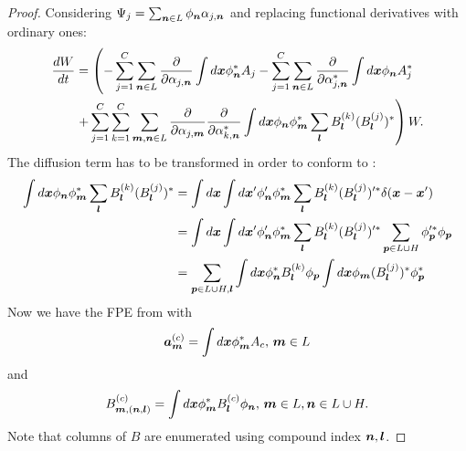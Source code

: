 \begin{proof}
Considering $\Psi_j = \sum_{\boldsymbol{n} \in L} \phi_{\boldsymbol{n}} \alpha_{j,\boldsymbol{n}}$ and replacing functional derivatives with ordinary ones:
\begin{equation*}
\begin{split}
	\frac{dW}{dt}
	& = \left(
		- \sum_{j=1}^C \sum_{\boldsymbol{n} \in L}
			\frac{\partial}{\partial \alpha_{j,\boldsymbol{n}}}
			\int d\boldsymbol{x} \phi_{\boldsymbol{n}}^* A_j
		- \sum_{j=1}^C \sum_{\boldsymbol{n} \in L}
			\frac{\partial}{\partial \alpha_{j,\boldsymbol{n}}^*}
			\int d\boldsymbol{x} \phi_{\boldsymbol{n}} A_j^*
		\right. \\
	&	\left. + \sum_{j=1}^C \sum_{k=1}^C
			\sum_{\boldsymbol{m},\boldsymbol{n} \in L}
			\frac{\partial}{\partial \alpha_{j,\boldsymbol{m}}}
			\frac{\partial}{\partial \alpha_{k,\boldsymbol{n}}^*}
			\int d\boldsymbol{x}
			\phi_{\boldsymbol{n}} \phi_{\boldsymbol{m}}^*
			\sum_{\boldsymbol{l}} B_{\boldsymbol{l}}^{(k)} (B_{\boldsymbol{l}}^{(j)})^*
	\right) W.
\end{split}
\end{equation*}
The diffusion term has to be transformed in order to conform to :
\begin{equation*}
\begin{split}
	\int d\boldsymbol{x} \phi_{\boldsymbol{n}} \phi_{\boldsymbol{m}}^* \sum_{\boldsymbol{l}} B_{\boldsymbol{l}}^{(k)} (B_{\boldsymbol{l}}^{(j)})^*
	& = \int d\boldsymbol{x} \int d\boldsymbol{x}^\prime
			\phi_{\boldsymbol{n}}^\prime \phi_{\boldsymbol{m}}^*
			\sum_{\boldsymbol{l}} B_{\boldsymbol{l}}^{(k)} (B_{\boldsymbol{l}}^{(j)})^{\prime*}
			\delta(\boldsymbol{x} - \boldsymbol{x}^\prime) \\
	& = \int d\boldsymbol{x} \int d\boldsymbol{x}^\prime
			\phi_{\boldsymbol{n}}^\prime \phi_{\boldsymbol{m}}^*
			\sum_{\boldsymbol{l}} B_{\boldsymbol{l}}^{(k)} (B_{\boldsymbol{l}}^{(j)})^{\prime*}
			\sum_{\boldsymbol{p} \in L \cup H} \phi_{\boldsymbol{p}}^{\prime*} \phi_{\boldsymbol{p}} \\
	& = \sum_{\boldsymbol{p} \in L \cup H, \boldsymbol{l}}
		\int d\boldsymbol{x}
			\phi_{\boldsymbol{n}}^* B_{\boldsymbol{l}}^{(k)} \phi_{\boldsymbol{p}}
		\int d\boldsymbol{x}
			\phi_{\boldsymbol{m}} (B_{\boldsymbol{l}}^{(j)})^* \phi_{\boldsymbol{p}}^*
\end{split}
\end{equation*}
Now we have the FPE from  with
\[
	\boldsymbol{a}_{\boldsymbol{m}}^{(c)} = \int d\boldsymbol{x} \phi_{\boldsymbol{m}}^* A_c,\,\boldsymbol{m} \in L
\]
and
\[
	B_{\boldsymbol{m},(\boldsymbol{n},\boldsymbol{l})}^{(c)} = \int d\boldsymbol{x} \phi_{\boldsymbol{m}}^* B_{\boldsymbol{l}}^{(c)} \phi_{\boldsymbol{n}},\,
	\boldsymbol{m} \in L, \boldsymbol{n} \in L \cup H.
\]
Note that columns of $B$ are enumerated using compound index $\boldsymbol{n},\boldsymbol{l}$.


\end{proof}
